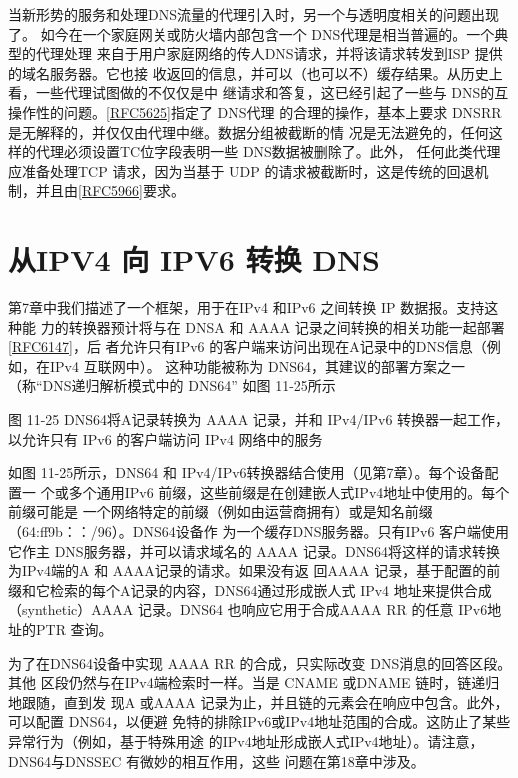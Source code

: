 当新形势的服务和处理DNS流量的代理引入时，另一个与透明度相关的问题出现了。
如今在一个家庭网关或防火墙内部包含一个 DNS代理是相当普遍的。一个典型的代理处理
来自于用户家庭网络的传人DNS请求，并将该请求转发到ISP 提供的域名服务器。它也接
收返回的信息，并可以（也可以不）缓存结果。从历史上看，一些代理试图做的不仅仅是中
继请求和答复，这已经引起了一些与 DNS的互操作性的问题。\href{https://www.rfc-editor.org/rfc/rfc5625}{[RFC5625]}指定了 DNS代理
的合理的操作，基本上要求 DNSRR 是无解释的，并仅仅由代理中继。数据分组被截断的情
况是无法避免的，任何这样的代理必须设置TC位字段表明一些 DNS数据被删除了。此外，
任何此类代理应准备处理TCP 请求，因为当基于 UDP 的请求被截断时，这是传统的回退机
制，并且由\href{https://www.rfc-editor.org/rfc/rfc5966}{[RFC5966]}要求。

\section{从IPV4 向 IPV6 转换 DNS}

第7章中我们描述了一个框架，用于在IPv4 和IPv6 之间转换 IP 数据报。支持这种能
力的转换器预计将与在 DNSA 和 AAAA 记录之间转换的相关功能一起部署\href{https://www.rfc-editor.org/rfc/rfc6147}{[RFC6147]}，后
者允许只有IPv6 的客户端来访问出现在A记录中的DNS信息（例如，在IPv4 互联网中）。
这种功能被称为 DNS64，其建议的部署方案之一（称“DNS递归解析模式中的 DNS64”
如图 11-25所示

图 11-25 DNS64将A记录转换为 AAAA 记录，并和 IPv4/IPv6 转换器一起工作，
以允许只有 IPv6 的客户端访问 IPv4 网络中的服务

如图 11-25所示，DNS64 和 IPv4/IPv6转换器结合使用（见第7章）。每个设备配置一
个或多个通用IPv6 前缀，这些前缀是在创建嵌人式IPv4地址中使用的。每个前缀可能是
一个网络特定的前缀（例如由运营商拥有）或是知名前缀（64:ff9b：：/96）。DNS64设备作
为一个缓存DNS服务器。只有IPv6 客户端使用它作主 DNS服务器，并可以请求域名的
AAAA 记录。DNS64将这样的请求转换为IPv4端的A 和 AAAA记录的请求。如果没有返
回AAAA 记录，基于配置的前缀和它检索的每个A记录的内容，DNS64通过形成嵌人式
IPv4 地址来提供合成（synthetic）AAAA 记录。DNS64 也响应它用于合成AAAA RR 的任意
IPv6地址的PTR 查询。

为了在DNS64设备中实现 AAAA RR 的合成，只实际改变 DNS消息的回答区段。其他
区段仍然与在IPv4端检索时一样。当是 CNAME 或DNAME 链时，链递归地跟随，直到发
现A 或AAAA 记录为止，并且链的元素会在响应中包含。此外，可以配置 DNS64，以便避
免特的排除IPv6或IPv4地址范围的合成。这防止了某些异常行为（例如，基于特殊用途
的IPv4地址形成嵌人式IPv4地址）。请注意，DNS64与DNSSEC 有微妙的相互作用，这些
问题在第18章中涉及。

